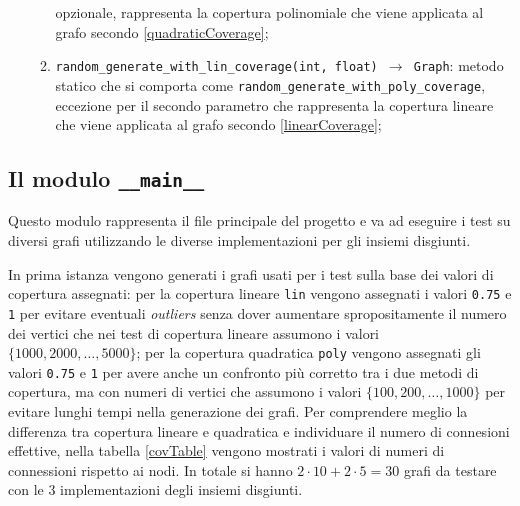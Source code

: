 \begin{enumerate}
\begin{enumerate}[resume]
                        opzionale, rappresenta la copertura polinomiale che viene applicata al grafo secondo \eqref{quadraticCoverage};
                  \item \texttt{random\_generate\_with\_lin\_coverage(int, float) $\rightarrow$ Graph}: metodo statico che si comporta come
                        \texttt{random\_generate\_with\_poly\_coverage}, eccezione per il secondo parametro che rappresenta la copertura lineare
                        che viene applicata al grafo secondo \eqref{linearCoverage};
            \end{enumerate}
\end{enumerate}

\subsection{Il modulo \texttt{\_\_main\_\_}}
Questo modulo rappresenta il file principale del progetto e va ad eseguire i test su diversi grafi utilizzando
le diverse implementazioni per gli insiemi disgiunti.\newline

In prima istanza vengono generati i grafi usati per i test sulla base dei valori di copertura assegnati: per la copertura lineare \texttt{lin}
vengono assegnati i valori \texttt{0.75} e \texttt{1} per evitare eventuali \textit{outliers} senza dover aumentare spropositamente il numero dei vertici
che nei test di copertura lineare assumono i valori $\{1000, 2000, \ldots, 5000\}$; per la copertura quadratica \texttt{poly} vengono assegnati
gli valori \texttt{0.75} e \texttt{1} per avere anche un confronto più corretto tra i due metodi di copertura, ma con numeri di vertici che
assumono i valori $\{100, 200, \ldots, 1000\}$ per evitare lunghi tempi nella generazione dei grafi. Per comprendere meglio la differenza tra copertura
lineare e quadratica e individuare il numero di connesioni effettive, nella tabella \ref{covTable} vengono mostrati i valori di numeri di connessioni
rispetto ai nodi. In totale si hanno $2 \cdot 10 + 2 \cdot 5 = 30$ grafi da testare con le 3 implementazioni degli insiemi disgiunti.\newline

